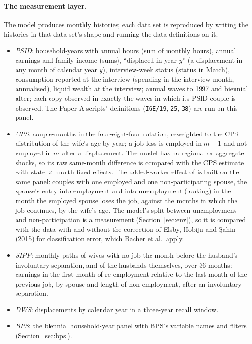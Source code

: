 \documentclass[11pt]{article}
\newcommand{\code}[1]{\texttt{#1}}
\newcommand{\1}{\mathbf{1}}
\begin{document}
\paragraph{The measurement layer.} The model produces monthly histories; each data set is reproduced by writing the
histories in that data set's shape and running the data definitions on it.
\begin{itemize}
  \item \emph{PSID}: household-years with annual hours (sum of monthly hours), annual earnings and family income (sums),
  ``displaced in year $y$'' (a displacement in any month of calendar year $y$), interview-week status (status in March),
  consumption reported at the interview (spending in the interview month, annualised), liquid wealth at the interview;
  annual waves to 1997 and biennial after; each copy observed in exactly the waves in which its PSID couple is observed.
  The Paper A scripts' definitions (\code{IGE/19}, \code{25}, \code{38}) are run on this panel.
  \item \emph{CPS}: couple-months in the four-eight-four rotation, reweighted to the CPS distribution of the wife's age by
  year; a job loss is employed in $m-1$ and not employed in $m$ after a displacement. The model has no regional or
  aggregate shocks, so its raw same-month difference is compared with the CPS estimate with state $\times$ month fixed
  effects. The added-worker effect of \citet{bacher2025joint} is built on the same panel: couples with one employed and
  one non-participating spouse, the spouse's entry into employment and into unemployment (looking) in the month the
  employed spouse loses the job, against the months in which the job continues, by the wife's age. The model's split
  between unemployment and non-participation is a measurement (Section~\ref{sec:env}), so it is compared with the data
  with and without the correction of Elsby, Hobijn and \c{S}ahin (2015) for classification error, which Bacher et al.\
  apply.
  \item \emph{SIPP}: monthly paths of wives with no job the month before the husband's involuntary separation, and of
  the husbands themselves, over 36 months; earnings in the first month of re-employment relative to the last month of
  the previous job, by spouse and length of non-employment, after an involuntary separation.
  \item \emph{DWS}: displacements by calendar year in a three-year recall window.
  \item \emph{BPS}: the biennial household-year panel with BPS's variable names and filters (Section~\ref{sec:bps}).
\end{itemize}
\end{document}

